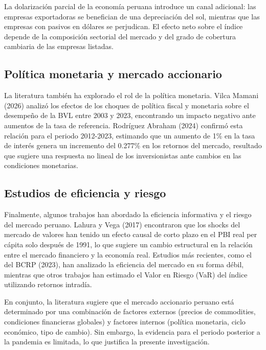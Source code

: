 \documentclass[12pt, a4paper]{article}
\begin{document}
La dolarización parcial de la economía peruana introduce un canal adicional: las empresas exportadoras se benefician de una depreciación del sol, mientras que las empresas con pasivos en dólares se perjudican. El efecto neto sobre el índice depende de la composición sectorial del mercado y del grado de cobertura cambiaria de las empresas listadas.

\subsection{Política monetaria y mercado accionario}

La literatura también ha explorado el rol de la política monetaria. Vilca Mamani (2026) analizó los efectos de los choques de política fiscal y monetaria sobre el desempeño de la BVL entre 2003 y 2023, encontrando un impacto negativo ante aumentos de la tasa de referencia. Rodríguez Abraham (2024) confirmó esta relación para el periodo 2012-2023, estimando que un aumento de 1\% en la tasa de interés genera un incremento del 0.277\% en los retornos del mercado, resultado que sugiere una respuesta no lineal de los inversionistas ante cambios en las condiciones monetarias.

\subsection{Estudios de eficiencia y riesgo}

Finalmente, algunos trabajos han abordado la eficiencia informativa y el riesgo del mercado peruano. Lahura y Vega (2017) encontraron que los shocks del mercado de valores han tenido un efecto causal de corto plazo en el PBI real per cápita solo después de 1991, lo que sugiere un cambio estructural en la relación entre el mercado financiero y la economía real. Estudios más recientes, como el del BCRP (2023), han analizado la eficiencia del mercado en su forma débil, mientras que otros trabajos han estimado el Valor en Riesgo (VaR) del índice utilizando retornos intradía.

En conjunto, la literatura sugiere que el mercado accionario peruano está determinado por una combinación de factores externos (precios de commodities, condiciones financieras globales) y factores internos (política monetaria, ciclo económico, tipo de cambio). Sin embargo, la evidencia para el periodo posterior a la pandemia es limitada, lo que justifica la presente investigación.

\end{document}
